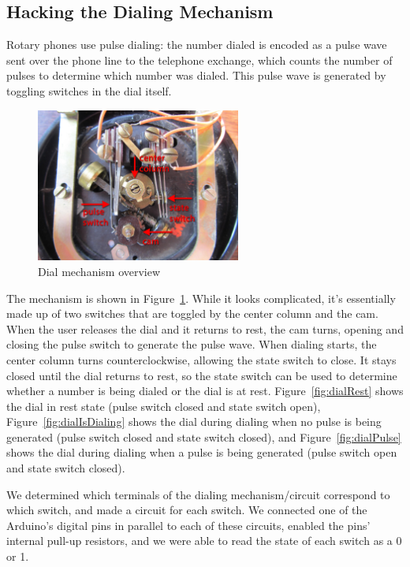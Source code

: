 \documentclass{es50report}
\begin{document}
    \subsection{Hacking the Dialing Mechanism}
    Rotary phones use pulse dialing: the number dialed is encoded as a pulse wave sent over the phone line to the telephone exchange, which counts the number of pulses to determine which number was dialed. This pulse wave is generated by toggling switches in the dial itself.

    \begin{figure}
        \centering
        \includegraphics[width=0.6\textwidth, clip=true, trim=200 50 200 70]{images/small/dialOverview}
        \caption{Dial mechanism overview}\label{fig:dialOverview}
    \end{figure}

    The mechanism is shown in Figure~\ref{fig:dialOverview}. While it looks complicated, it's essentially made up of two switches that are toggled by the center column and the cam. When the user releases the dial and it returns to rest, the cam turns, opening and closing the pulse switch to generate the pulse wave. When dialing starts, the center column turns counterclockwise, allowing the state switch to close. It stays closed until the dial returns to rest, so the state switch can be used to determine whether a number is being dialed or the dial is at rest. Figure~\ref{fig:dialRest} shows the dial in rest state (pulse switch closed and state switch open), Figure~\ref{fig:dialIsDialing} shows the dial during dialing when no pulse is being generated (pulse switch closed and state switch closed), and Figure~\ref{fig:dialPulse} shows the dial during dialing when a pulse is being generated (pulse switch open and state switch closed).

    We determined which terminals of the dialing mechanism/circuit correspond to which switch, and made a circuit for each switch. We connected one of the Arduino's digital pins in parallel to each of these circuits, enabled the pins' internal pull-up resistors, and we were able to read the state of each switch as a 0 or 1.
\end{document}

